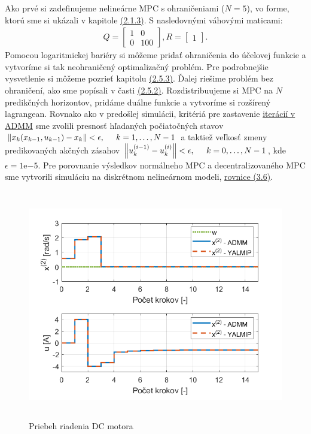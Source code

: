 Ako prvé si zadefinujeme nelineárne MPC s ohraničeniami ($N = 5$), vo forme, ktorú sme si ukázali v kapitole  \hyperref[subse:NelinearneMPC]{(2.1.3)}. S nasledovnými váhovými maticami:
\begin{align}
	Q = \begin{bmatrix}
		1&0\\
		0&100
	\end{bmatrix}, 
	R = \begin{bmatrix}
	1
	\end{bmatrix}.
\end{align}
Pomocou logaritmickej bariéry si môžeme pridať ohraničenia do účelovej funkcie a vytvoríme si tak neohraničený optimalizačný problém. Pre podrobnejšie vysvetlenie si môžeme pozrieť kapitolu \hyperref[subse:Ohranicenia]{(2.5.3)}. Ďalej riešime problém bez ohraničení, ako sme popísali v časti \hyperref[subse:Nelin_MPC_ADMM]{(2.5.2)}. Rozdistribuujeme si MPC na $N$ predikčných horizontov, pridáme duálne funkcie a vytvoríme si rozšírený lagrangean. Rovnako ako v predošlej simulácii, kritériá pre zastavenie \hyperref[subse:ADMM2]{iterácií v ADMM} sme zvolili presnosť hľadaných počiatočných stavov $\left\lVert x_{k}(x_{k-1},u_{k-1})- x_{k}\right\rVert < \epsilon,\hspace{0.5cm} k=1,\dots,N-1$ a taktiež veľkosť zmeny predikovaných akčných zásahov $\left\lVert u_{k}^{(i-1)}-u_{k}^{(i)}\right\rVert < \epsilon,\hspace{0.5cm} k=0,\dots,N-1$, kde $\epsilon = 1\mathrm{e}{-5}$. Pre porovnanie výsledkov normálneho MPC a decentralizovaného MPC sme vytvorili simuláciu na diskrétnom nelineárnom modeli, \hyperref[math:Dmodel_DC]{rovnice (3.6)}.
\begin{figure}[H]
	\centering
	\includegraphics[width=13cm,height=10cm]{images/DC_motor/Priebeh_riadenia_a_akcne_zasahy}
	\caption{Priebeh riadenia DC motora}
	\label{fig7: PR}
\end{figure}
